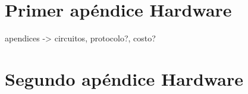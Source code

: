 
\section{Primer ap\'endice Hardware}

apendices -> circuitos, protocolo?, costo?

\section{Segundo ap\'endice Hardware}

